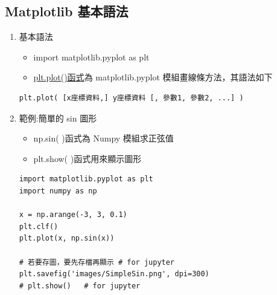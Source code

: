 \documentclass[a4paper,12pt]{article}
\begin{document}
\subsection{Matplotlib 基本語法}
\label{sec:org8d55638}
\begin{enumerate}
\item 基本語法
\label{sec:orgcbe67db}
\begin{itemize}
\item import matplotlib.pyplot as plt\\
\item \href{https://matplotlib.org/3.2.1/api/\_as\_gen/matplotlib.pyplot.plot.html}{plt.plot()函式}為 matplotlib.pyplot 模組畫線條方法，其語法如下 \\
\end{itemize}
\lstset{breaklines=true,language=Python,label= ,caption= ,captionpos=b,numbers=none}
\begin{lstlisting}
plt.plot( [x座標資料,] y座標資料 [, 參數1, 參數2, ...] )
\end{lstlisting}
\item 範例:簡單的 sin 圖形
\label{sec:org4dade57}
\begin{itemize}
\item np.sin( )函式為 Numpy 模組求正弦值\\
\item plt.show( )函式用來顯示圖形\\
\end{itemize}
\lstset{breaklines=true,language=Python,label= ,caption= ,captionpos=b,firstnumber=1,numbers=left}
\begin{lstlisting}
import matplotlib.pyplot as plt
import numpy as np

x = np.arange(-3, 3, 0.1)
plt.clf()
plt.plot(x, np.sin(x))

# 若要存圖，要先存檔再顯示 # for jupyter
plt.savefig('images/SimpleSin.png', dpi=300)
# plt.show()   # for jupyter



\end{lstlisting}
\end{enumerate}
\end{document}
